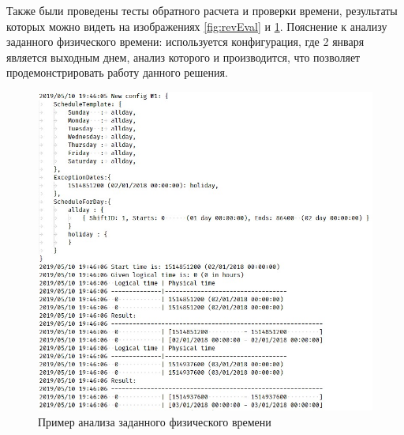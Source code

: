 \indent Также были проведены тесты обратного расчета и проверки времени, результаты которых можно видеть на изображениях \ref{fig:revEval} и \ref{fig:checkEval}.
Пояснение к анализу заданного физического времени: используется конфигурация, где 2 января является выходным днем, анализ которого и производится, что позволяет продемонстрировать работу данного решения.
\begin{figure}[h!]
	\centering
	\includegraphics[scale=0.6]{pics/scheduleCheckDateEval.png}
	\caption{Пример анализа заданного физического времени}
	\label{fig:checkEval}
\end{figure}


